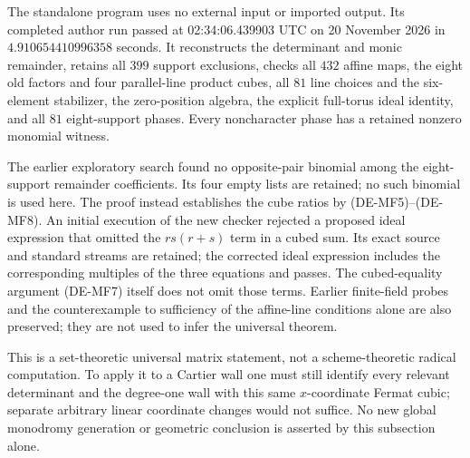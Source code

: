 \begin{remark}
\label{rem:DE-Moore-Fermat-scope}
The standalone program
uses no external input or imported output. Its completed author
run passed at 02:34:06.439903 UTC on 20 November 2026 in
\(4.910654410996358\) seconds. It reconstructs the determinant
and monic remainder, retains all \(399\) support exclusions,
checks all \(432\) affine maps, the eight old factors and four
parallel-line product cubes, all \(81\) line choices and the
six-element stabilizer, the zero-position algebra, the explicit
full-torus ideal identity, and all \(81\) eight-support phases.
Every noncharacter phase has a retained nonzero monomial witness.

The earlier exploratory search found no opposite-pair binomial
among the eight-support remainder coefficients. Its four empty
lists are retained; no such binomial is used here. The proof
instead establishes the cube ratios by (DE-MF5)--(DE-MF8).
An initial execution of the new checker rejected a proposed
ideal expression that omitted the \(rs(r+s)\) term in a cubed
sum. Its exact source and standard streams are retained; the
corrected ideal expression includes the corresponding multiples
of the three equations and passes. The cubed-equality argument
(DE-MF7) itself does not omit those terms. Earlier finite-field
probes and the counterexample to sufficiency of the affine-line
conditions alone are also preserved; they are not used to infer
the universal theorem.

This is a set-theoretic universal matrix statement, not a
scheme-theoretic radical computation. To apply it to a Cartier
wall one must still identify every relevant determinant and the
degree-one wall with this same \(x\)-coordinate Fermat cubic;
separate arbitrary linear coordinate changes would not suffice.
No new global monodromy generation or geometric conclusion is
asserted by this subsection alone.
\end{remark}
